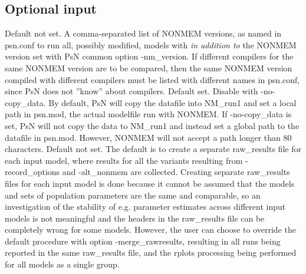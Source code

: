 			\subsection{Optional input}
			\begin{optionlist}
			Default not set. 
			A comma-separated list of NONMEM versions, as named in psn.conf to run all, possibly modified, models with
			\emph{in addition to} the NONMEM version set with PsN common option -nm\_version.
			If different compilers for the same NONMEM version are to be compared, 
			then the same NONMEM version compiled with different compilers
			must be listed with different names in psn.conf, since PsN does not ''know'' about compilers.
			\nextopt
			Default set. Disable with -no-copy\_data. By default, PsN will copy the datafile into NM\_run1 and set a 
			local path in psn.mod, the actual modelfile run with NONMEM. If -no-copy\_data is set, PsN will not copy 
			the data to NM\_run1 and instead set a global path to the datafile in psn.mod. However, NONMEM will not 
			accept a path longer than 80 characters.
			\nextopt
		    \nextopt
			Default not set. The default is to create a separate raw\_results file for each input model,
			where results for all the variants resulting from -record\_options and -alt\_nonmem
			are collected. Creating separate raw\_results files for each input model is done because
			it cannot be assumed that the models and sets of population parameters are the same and comparable,
			so an investigation of the stability of e.g. parameter estimates across different input models
			is not meaningful and the headers in the raw\_results file can be completely wrong for some models. 
			However, the user can choose to override the default procedure
			with option -merge\_rawresults, resulting in all runs being reported in the same raw\_results file,
			and the rplots processing being performed for all models as a single group.

\end{optionlist}

